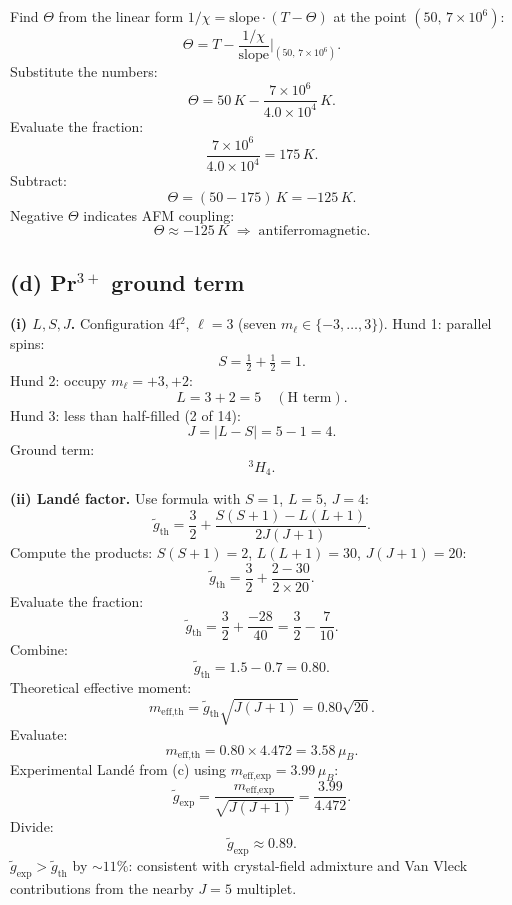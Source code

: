 \documentclass[11pt]{article}
\begin{document}
Find $\Theta$ from the linear form $1/\chi=\text{slope}\cdot(T-\Theta)$ at the point $(50,\,7\times 10^6)$:
\[ \Theta=T-\frac{1/\chi}{\text{slope}}\Big|_{(50,\,7\times 10^6)}. \]
Substitute the numbers:
\[ \Theta=50\,\si{K}-\frac{7\times 10^6}{4.0\times 10^4}\,\si{K}. \]
Evaluate the fraction:
\[ \frac{7\times 10^6}{4.0\times 10^4}=175\,\si{K}. \]
Subtract:
\[ \Theta=(50-175)\,\si{K}=-125\,\si{K}. \]
Negative $\Theta$ indicates AFM coupling:
\[ \boxed{\;\Theta\approx -125\,\si{K}\;\Rightarrow\;\text{antiferromagnetic.}\;} \]

\subsection*{(d) Pr$^{3+}$ ground term}

\textbf{(i) $L,S,J$.} Configuration 4f$^2$, $\ell=3$ (seven $m_\ell\in\{-3,\dots,3\}$).
Hund 1: parallel spins:
\[ S=\tfrac12+\tfrac12=1. \]
Hund 2: occupy $m_\ell=+3,+2$:
\[ L=3+2=5\quad(\text{H term}). \]
Hund 3: less than half-filled (2 of 14):
\[ J=|L-S|=5-1=4. \]
Ground term:
\[ \boxed{\;{}^3 H_4.\;} \]

\textbf{(ii) Land\'e factor.} Use formula with $S=1$, $L=5$, $J=4$:
\[ \tilde g_{\text{th}}=\frac{3}{2}+\frac{S(S+1)-L(L+1)}{2J(J+1)}. \]
Compute the products: $S(S+1)=2$, $L(L+1)=30$, $J(J+1)=20$:
\[ \tilde g_{\text{th}}=\frac{3}{2}+\frac{2-30}{2\times 20}. \]
Evaluate the fraction:
\[ \tilde g_{\text{th}}=\frac{3}{2}+\frac{-28}{40}=\frac{3}{2}-\frac{7}{10}. \]
Combine:
\[ \tilde g_{\text{th}}=1.5-0.7=0.80. \]
Theoretical effective moment:
\[ m_{\text{eff,th}}=\tilde g_{\text{th}}\sqrt{J(J+1)}=0.80\sqrt{20}. \]
Evaluate:
\[ m_{\text{eff,th}}=0.80\times 4.472=3.58\,\mu_B. \]
Experimental Land\'e from (c) using $m_{\text{eff,exp}}=3.99\,\mu_B$:
\[ \tilde g_{\text{exp}}=\frac{m_{\text{eff,exp}}}{\sqrt{J(J+1)}}=\frac{3.99}{4.472}. \]
Divide:
\[ \boxed{\;\tilde g_{\text{exp}}\approx 0.89.\;} \]
$\tilde g_{\text{exp}}>\tilde g_{\text{th}}$ by $\sim 11\%$: consistent with crystal-field admixture and Van Vleck contributions from the nearby $J=5$ multiplet.
\end{document}
